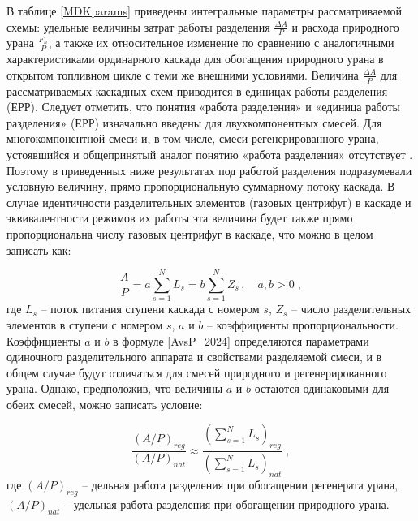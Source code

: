 В таблице \ref{MDKparams} приведены интегральные параметры рассматриваемой схемы: удельные величины затрат работы разделения $\frac{\Delta A}{P}$ и расхода природного урана $\frac{F_n}{P}$, а также их относительное изменение по сравнению с аналогичными характеристиками ординарного каскада для обогащения природного урана в открытом топливном цикле с теми же внешними условиями. Величина $\frac{\Delta A}{P}$ для рассматриваемых каскадных схем приводится в единицах работы разделения (ЕРР).
Следует отметить, что понятия «работа разделения» и «единица работы разделения» (ЕРР) изначально введены для двухкомпонентных смесей. Для многокомпонентной смеси и, в том числе, смеси регенерированного урана, устоявшийся и общепринятый аналог понятию «работа разделения» отсутствует \cite{2024sep_potential_ifz}. Поэтому в приведенных ниже результатах под работой разделения подразумевали условную величину, прямо пропорциональную суммарному потоку каскада. В случае идентичности разделительных элементов (газовых центрифуг) в каскаде и эквивалентности режимов их работы эта величина будет также прямо пропорциональна числу газовых центрифуг в каскаде, что можно в целом записать как:

\begin{equation}\label{AvsP_2024}
  \frac{A}{P}=a\sum_{s=1}^N L_s=b\sum_{s=1}^N Z_s \, ,\quad a,b>0 \; ,
\end{equation}
где $L_s$ -- поток питания ступени каскада с номером $s$, $Z_s$ --  число разделительных элементов в ступени с номером $s$, $a$ и $b$ -- коэффициенты пропорциональности. Коэффициенты $a$ и $b$ в формуле \ref{AvsP_2024} определяются параметрами одиночного разделительного аппарата и свойствами разделяемой смеси, и в общем случае будут отличаться для смесей природного и регенерированного урана. Однако, предположив, что величины $a$ и $b$  остаются одинаковыми для обеих смесей, можно записать условие:

\begin{equation}\label{AvsP_regnat_2024}
  \frac{(A/P)_{reg}}{(A/P)_{nat}} \approx \frac{(\sum_{s=1}^N L_s)_{reg}}{(\sum_{s=1}^N L_s)_{nat}} \; ,
\end{equation}
где $(A/P)_{reg}$ -- дельная работа разделения при обогащении регенерата урана,  $(A/P)_{nat}$ -- удельная работа разделения при обогащении природного урана.

